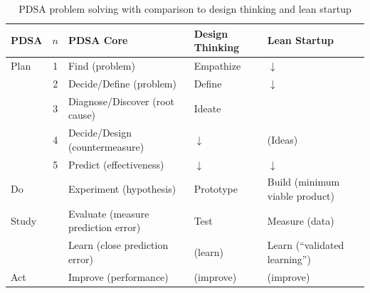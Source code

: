\documentclass[landscape]{article}
\begin{document}
\thispagestyle{empty}



\begin{table}
  \centering
  \setcounter{table}{0} %
  \caption{PDSA problem solving with comparison to design thinking and lean startup}
\begin{tabular}{lclll}
\toprule
  PDSA &$n$&PDSA Core&Design Thinking&Lean Startup\\
  \midrule
  Plan &1&Find (problem)      &Empathize&$\downarrow$\\
                    &2&Decide/Define (problem)&Define&$\downarrow$\\
  &3&Diagnose/Discover (root cause)&Ideate&\\
       &4&Decide/Design (countermeasure)&$\downarrow$&(Ideas)\\
       &5&Predict (effectiveness)&$\downarrow$&$\downarrow$\\
  Do   &&Experiment (hypothesis)&Prototype&Build (minimum viable product)\\
  Study &&Evaluate (measure prediction error)&Test&Measure (data)\\
  &&Learn (close prediction error)&(learn)&Learn (``validated learning'')\\
  Act  &&Improve (performance)&(improve)&(improve)\\
\bottomrule
\end{tabular}   
\end{table}


\bigskip
   
\end{document}
